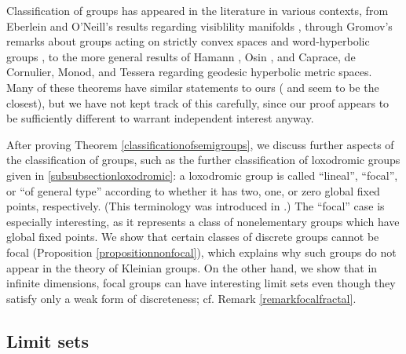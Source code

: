 Classification of groups has appeared in the literature in various contexts, from Eberlein and O'Neill's results regarding visiblility manifolds \cite{EberleinOneill}, through Gromov's remarks about groups acting on strictly convex spaces \cite[]{Gromov1} and word-hyperbolic groups \cite[]{Gromov3}, to the more general results of Hamann \cite[Theorem 2.7]{Hamann}, Osin \cite[]{Osin}, and Caprace, de Cornulier, Monod, and Tessera \cite[\63.A]{CCMT} regarding geodesic hyperbolic metric spaces. Many of these theorems have similar statements to ours (\cite{Hamann} and \cite{CCMT} seem to be the closest), but we have not kept track of this carefully, since our proof appears to be sufficiently different to warrant independent interest anyway.

After proving Theorem \ref{classificationofsemigroups}, we discuss further aspects of the classification of groups, such as the further classification of loxodromic groups given in \6\ref{subsubsectionloxodromic}: a loxodromic group is called ``lineal'', ``focal'', or ``of general type'' according to whether it has two, one, or zero global fixed points, respectively. (This terminology was introduced in \cite{CCMT}.) The ``focal'' case is especially interesting, as it represents a class of nonelementary groups which have global fixed points. We show that certain classes of discrete groups cannot be focal (Proposition \ref{propositionnonfocal}), which explains why such groups do not appear in the theory of Kleinian groups. On the other hand, we show that in infinite dimensions, focal groups can have interesting limit sets even though they satisfy only a weak form of discreteness; cf. Remark \ref{remarkfocalfractal}.

\subsection{Limit sets}

